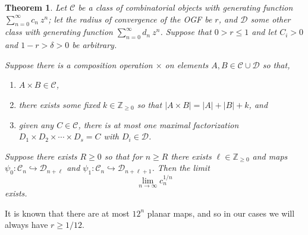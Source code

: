 \documentclass[amsmath,longbibliography,secnumarabic,floatfix,amssymb,nofootinbib,nobibnotes,letterpaper,11pt,tightenlines,notitlepage,showkeys,showlabels]{amsart}%
\newcommand{\Z}{\mathbb{Z}} \newcommand{\N}{\mathbb{N}}
\newcommand{\ArbClass}{\mathscr{C}}
\newcommand{\ArbSubClass}{\mathscr{D}}
\newcommand{\arbsubclass}{d}
\newcommand{\arbclass}{c}
\newtheorem{theorem}{Theorem}
\begin{document}
\begin{theorem}
  Let $\ArbClass$ be a class of combinatorial objects with generating
  function $\sum_{n=0}^{\infty}{\arbclass_n~z^n}$; let the radius of
  convergence of the OGF be $r$, and $\ArbSubClass$ some other class
  with generating function
  $\sum_{n=0}^{\infty}{\arbsubclass_n~z^n}$. Suppose that $0 > r \le
  1$ and let $C_i > 0$ and $1-r>\delta>0$ be arbitrary.

  Suppose there is a composition operation $\times$ on elements $A, B
  \in \ArbClass \cup \ArbSubClass$ so that,
  \begin{enumerate}
  \item $A \times B \in \ArbClass$,
  \item there exists some fixed $k \in \Z_{\ge 0}$ so that $|A \times
    B| = |A| + |B| + k$, and
  \item given any $C \in \ArbClass$, there is at most one maximal
    factorization $D_1 \times D_2 \times \cdots \times D_s = C$ with $D_i
    \in \ArbSubClass$.
  \end{enumerate} Suppose there exists $R \ge 0$ so that for $n \ge R$
  there exists $\ell \in \Z_{\ge 0}$ and maps $\psi_0: \ArbClass_n
  \hookrightarrow \ArbSubClass_{n+\ell}$ and $ \psi_1: \ArbClass_n
  \hookrightarrow \ArbSubClass_{n+\ell+1}$. Then the limit
  \[ \lim_{n\to\infty}{\arbclass_n^{1/n}} \] exists.
\end{theorem}

It is known that there are at most $12^n$ planar maps, and so in our cases we will always have $r
\ge 1/12$.
\end{document}

